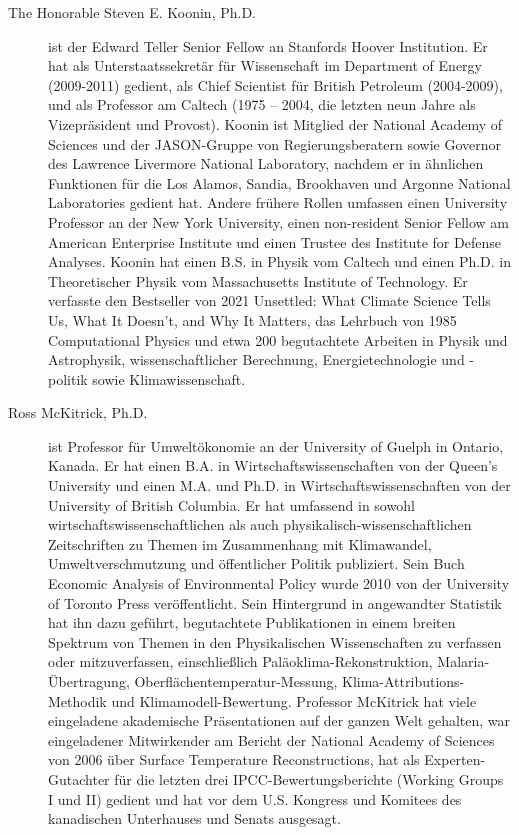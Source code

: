\documentclass[12pt,paper=a4,DIV=12,parskip=never,chapterprefix=false,headings=standardclasses]{scrreprt}
\begin{document}
\begin{description}
  \item[The Honorable Steven E. Koonin, Ph.D.] ist der Edward Teller Senior Fellow an Stanfords Hoover Institution. Er hat als Unterstaatssekretär für Wissenschaft im Department of Energy (2009-2011) gedient, als Chief Scientist für British Petroleum (2004-2009), und als Professor am Caltech (1975 – 2004, die letzten neun Jahre als Vizepräsident und Provost). Koonin ist Mitglied der National Academy of Sciences und der JASON-Gruppe von Regierungsberatern sowie Governor des Lawrence Livermore National Laboratory, nachdem er in ähnlichen Funktionen für die Los Alamos, Sandia, Brookhaven und Argonne National Laboratories gedient hat. Andere frühere Rollen umfassen einen University Professor an der New York University, einen non-resident Senior Fellow am American Enterprise Institute und einen Trustee des Institute for Defense Analyses. Koonin hat einen B.S. in Physik vom Caltech und einen Ph.D. in Theoretischer Physik vom Massachusetts Institute of Technology. Er verfasste den Bestseller von 2021 Unsettled: What Climate Science Tells Us, What It Doesn't, and Why It Matters, das Lehrbuch von 1985 Computational Physics und etwa 200 begutachtete Arbeiten in Physik und Astrophysik, wissenschaftlicher Berechnung, Energietechnologie und -politik sowie Klimawissenschaft.
  \item[Ross McKitrick, Ph.D.] ist Professor für Umweltökonomie an der University of Guelph in Ontario, Kanada. Er hat einen B.A. in Wirtschaftswissenschaften von der Queen's University und einen M.A. und Ph.D. in Wirtschaftswissenschaften von der University of British Columbia. Er hat umfassend in sowohl wirtschaftswissenschaftlichen als auch physikalisch-wissenschaftlichen Zeitschriften zu Themen im Zusammenhang mit Klimawandel, Umweltverschmutzung und öffentlicher Politik publiziert. Sein Buch Economic Analysis of Environmental Policy wurde 2010 von der University of Toronto Press veröffentlicht. Sein Hintergrund in angewandter Statistik hat ihn dazu geführt, begutachtete Publikationen in einem breiten Spektrum von Themen in den Physikalischen Wissenschaften zu verfassen oder mitzuverfassen, einschließlich Paläoklima-Rekonstruktion, Malaria-Übertragung, Oberflächentemperatur-Messung, Klima-Attributions-Methodik und Klimamodell-Bewertung. Professor McKitrick hat viele eingeladene akademische Präsentationen auf der ganzen Welt gehalten, war eingeladener Mitwirkender am Bericht der National Academy of Sciences von 2006 über Surface Temperature Reconstructions, hat als Experten-Gutachter für die letzten drei IPCC-Bewertungsberichte (Working Groups I und II) gedient und hat vor dem U.S. Kongress und Komitees des kanadischen Unterhauses und Senats ausgesagt.

\end{description}
\end{document}
